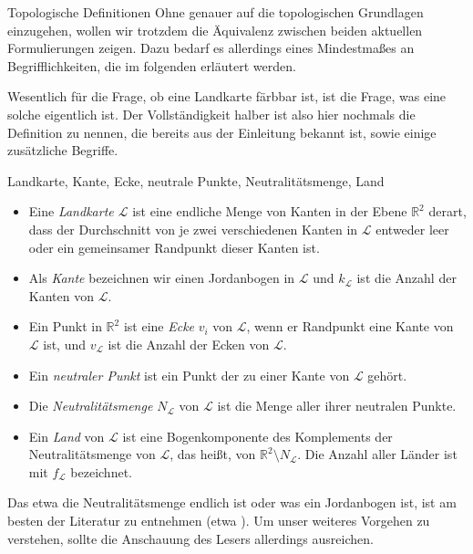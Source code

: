 \begin{section}{Topologische Definitionen}
 Ohne genauer auf die topologischen Grundlagen einzugehen, wollen wir trotzdem die Äquivalenz zwischen beiden aktuellen Formulierungen zeigen. Dazu bedarf es allerdings eines Mindestmaßes an Begrifflichkeiten, die im folgenden erläutert werden.
 
 Wesentlich für die Frage, ob eine Landkarte färbbar ist, ist die Frage, was eine solche eigentlich ist. Der Vollständigkeit halber ist also hier nochmals die Definition zu nennen, die bereits aus der Einleitung bekannt ist, sowie einige zusätzliche Begriffe.
 
 \begin{definition}{Landkarte, Kante, Ecke, neutrale Punkte, Neutralitätsmenge, Land}
  \-\ 
  \begin{itemize}
    \item Eine \textit{Landkarte $\mathcal{L}$} ist eine endliche Menge von Kanten in der Ebene $\mathbb{R}^2$ derart, dass der Durchschnitt von je zwei verschiedenen Kanten in $\mathcal{L}$ entweder leer oder ein gemeinsamer Randpunkt dieser Kanten ist. 
    \item Als \textit{Kante} bezeichnen wir einen Jordanbogen in $\mathcal{L}$ und $k_\mathcal{L}$ ist die Anzahl der Kanten von $\mathcal{L}$.
    \item Ein Punkt in $\mathbb{R}^2$ ist eine \textit{Ecke} $v_i$ von $\mathcal{L}$, wenn er Randpunkt eine Kante von $\mathcal{L}$ ist, und $v_\mathcal{L}$ ist die Anzahl der Ecken von $\mathcal{L}$.
    \item Ein \textit{neutraler Punkt} ist ein Punkt der zu einer Kante von $\mathcal{L}$ gehört.
    \item Die \textit{Neutralitätsmenge $N_{\mathcal{L}}$} von $\mathcal{L}$ ist die Menge aller ihrer neutralen Punkte. 
    \item Ein \textit{Land} von $\mathcal{L}$ ist eine Bogenkomponente des Komplements der Neutralitätsmenge von $\mathcal{L}$, das heißt, von $\mathbb{R}^2 \setminus N_{\mathcal{L}}$. Die Anzahl aller Länder ist mit $f_\mathcal{L}$ bezeichnet.
  \end{itemize}
 \end{definition}
 
 Das etwa die Neutralitätsmenge endlich ist oder was ein Jordanbogen ist, ist am besten der Literatur zu entnehmen (etwa \cite[Kapitel 2]{fritsch}). Um unser weiteres Vorgehen zu verstehen, sollte die Anschauung des Lesers allerdings ausreichen.
 

\end{section}
